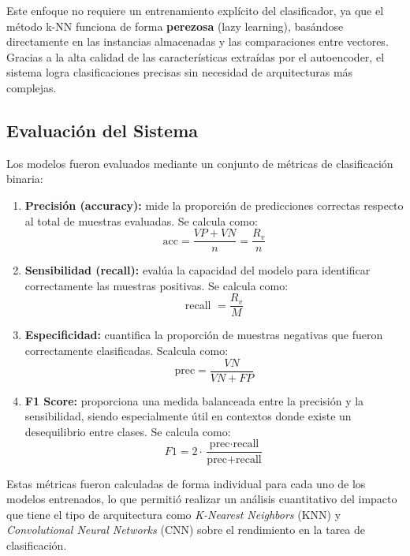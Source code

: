 \documentclass[12pt]{article} %
\begin{document}
Este enfoque no requiere un entrenamiento explícito del clasificador, ya que el método k-NN funciona de forma \textbf{perezosa} (lazy learning), basándose directamente en las instancias almacenadas y las comparaciones entre vectores. Gracias a la alta calidad de las características extraídas por el autoencoder, el sistema logra clasificaciones precisas sin necesidad de arquitecturas más complejas.

\subsection{Evaluación del Sistema}
Los modelos fueron evaluados mediante un conjunto de métricas de clasificación binaria:

\begin{enumerate}
    \item \textbf{Precisión (accuracy):} mide la proporción de predicciones correctas respecto al total de muestras evaluadas. Se calcula como:
    \begin{equation}
        \text{acc} = \frac{VP + VN}{n} = \frac{R_v}{n}
    \end{equation}
    \item \textbf{Sensibilidad (recall):} evalúa la capacidad del modelo para identificar correctamente las muestras positivas. Se calcula como:
    \begin{equation}
        \text{recall } = \frac{R_v}{M}
    \end{equation}
    \item \textbf{Especificidad:} cuantifica la proporción de muestras negativas que fueron correctamente clasificadas. Scalcula como:
    \begin{equation}
        \text{prec} = \frac{VN}{VN + FP}
    \end{equation}
    \item \textbf{F1 Score:} proporciona una medida balanceada entre la precisión y la sensibilidad, siendo especialmente útil en contextos donde existe un desequilibrio entre clases. Se calcula como:
    \begin{equation}
        F1 = 2 \cdot \frac{\text{prec} \cdot \text{recall}}{\text{prec} + \text{recall}}
    \end{equation}
\end{enumerate}

Estas métricas fueron calculadas de forma individual para cada uno de los modelos entrenados, lo que permitió realizar un análisis cuantitativo del impacto que tiene el tipo de arquitectura como \textit{K-Nearest Neighbors} (KNN) y \textit{Convolutional Neural Networks} (CNN) sobre el rendimiento en la tarea de clasificación. \\
\end{document}
